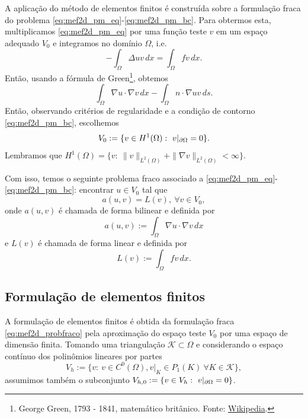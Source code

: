 A aplicação do método de elementos finitos é construída sobre a formulação fraca do problema \eqref{eq:mef2d_pm_eq}-\eqref{eq:mef2d_pm_bc}. Para obtermos esta, multiplicamos \eqref{eq:mef2d_pm_eq} por uma função teste $v$ em um espaço adequado $V_0$ e integramos no domínio $\Omega$, i.e.
\begin{equation}
  - \int_\Omega \Delta uv\,dx = \int_\Omega fv\,dx.
\end{equation}
Então, usando a fórmula de Green\footnote{George Green, 1793 - 1841, matemático britânico. Fonte: \href{https://en.wikipedia.org/wiki/George_Green_(mathematician)}{Wikipedia}.}, obtemos
\begin{equation}
  \int_\Omega \nabla u\cdot\nabla v\,dx - \int_\Omega n\cdot\nabla uv\,ds.
\end{equation}
Então, observando critérios de regularidade e a condição de contorno \eqref{eq:mef2d_pm_bc}, escolhemos
\begin{equation}
  V_0 := \{v\in H^1(\Omega):~v|_{\partial\Omega}=0\}.
\end{equation}
Lembramos que $H^1(\Omega) = \{v:~\|v\|_{L^2(\Omega)}+\|\nabla v\|_{L^2(\Omega)}<\infty\}$.

Com isso, temos o seguinte problema fraco associado a \eqref{eq:mef2d_pm_eq}-\eqref{eq:mef2d_pm_bc}: encontrar $u\in V_0$ tal que
\begin{equation}\label{eq:mef2d_probfraco}
  a(u,v) = L(v),~\forall v\in V_0,
\end{equation}
onde $a(u, v)$ é chamada de forma bilinear e definida por
\begin{equation}
  a(u,v) := \int_\Omega \nabla u\cdot\nabla v\,dx
\end{equation}
e $L(v)$ é chamada de forma linear e definida por
\begin{equation}
  L(v) := \int_\Omega fv\,dx.
\end{equation}

\subsection{Formulação de elementos finitos}

A formulação de elementos finitos é obtida da formulação fraca \eqref{eq:mef2d_probfraco} pela aproximação do espaço teste $V_0$ por uma espaço de dimensão finita. Tomando uma triangulação $\mathcal{K}\subset\Omega$ e considerando o espaço contínuo dos polinômios lineares por partes
\begin{equation}
  V_h := \{v:~v\in C^0(\Omega), v|_K\in P_1(K)~\forall K\in\mathcal{K}\},
\end{equation}
assumimos também o subconjunto $V_{h,0}:= \{v\in V_h:~v|_{\partial\Omega}=0\}$.

